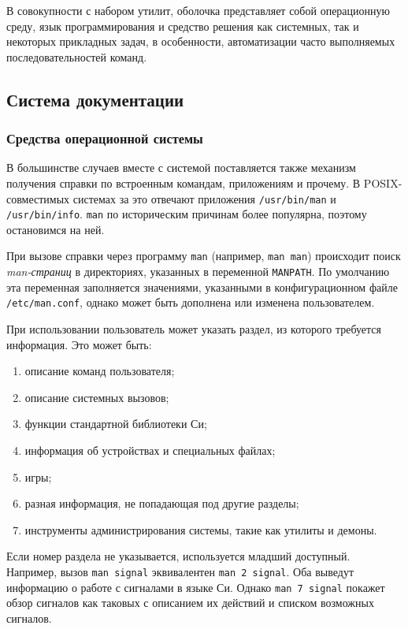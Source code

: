 В совокупности с набором утилит, оболочка представляет собой операционную среду, язык программирования и средство решения как системных, так и некоторых прикладных задач, в особенности, автоматизации часто выполняемых последовательностей команд.

\subsection{Система документации}\label{base:os:structure:docs}
\subsubsection{Средства операционной системы}
В большинстве случаев вместе с системой поставляется также механизм получения справки по встроенным командам, приложениям и прочему. В POSIX-совместимых системах за это отвечают приложения \texttt{/usr/bin/man} и \texttt{/usr/bin/info}. \texttt{man} по историческим причинам более популярна, поэтому остановимся на ней.

При вызове справки через программу \texttt{man} (например, \texttt{man man}) происходит поиск \emph{man-страниц} в директориях, указанных в переменной \texttt{MANPATH}. По умолчанию эта переменная заполняется значениями, указанными в конфигурационном файле \texttt{/etc/man.conf}, однако может быть дополнена или изменена пользователем.

При использовании пользователь может указать раздел, из которого требуется информация. Это может быть:
\begin{enumerate}
 \item описание команд пользователя;
 \item описание системных вызовов;
 \item функции стандартной библиотеки Си;
 \item информация об устройствах и специальных файлах;
 \item игры;
 \item разная информация, не попадающая под другие разделы;
 \item инструменты администрирования системы, такие как утилиты и демоны.
\end{enumerate}
Если номер раздела не указывается, используется младший доступный.
Например, вызов \texttt{man signal} эквивалентен \texttt{man 2 signal}. Оба выведут информацию о работе с сигналами в языке Си. Однако \texttt{man 7 signal} покажет обзор сигналов как таковых с описанием их действий и списком возможных сигналов.

